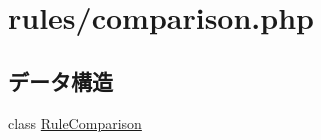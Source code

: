 \hypertarget{comparison_8php}{
\section{rules/comparison.php}
\label{comparison_8php}
}
\subsection*{データ構造}
\begin{DoxyCompactItemize}
\item 
class \hyperlink{class_rule_comparison}{\-Rule\-Comparison}
\end{DoxyCompactItemize}
